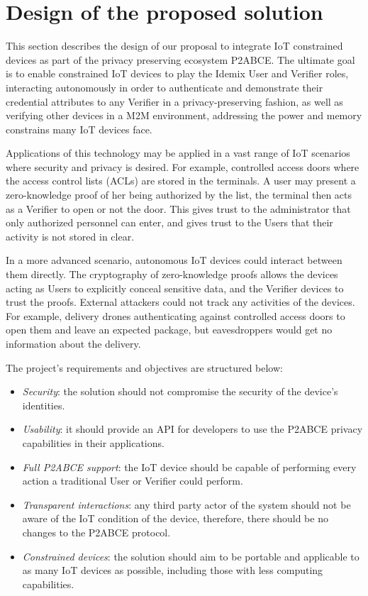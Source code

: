 
\section{Design of the proposed solution}\label{ch:design}

This section describes the design of our proposal to integrate IoT constrained devices as part of the privacy preserving ecosystem P2ABCE. The ultimate goal is to enable constrained IoT devices to play the Idemix User and Verifier roles, interacting autonomously in order to authenticate and demonstrate their credential attributes to any Verifier in a privacy-preserving fashion, as well as verifying other devices in a M2M environment, addressing the power and memory constrains many IoT devices face. 

Applications of this technology may be applied in a vast range of IoT scenarios where security and privacy is desired. For example, controlled access doors where the access control lists (ACLs) are stored in the terminals. A user may present a zero-knowledge proof of her being authorized by the list, the terminal then acts as a Verifier to open or not the door. This gives trust to the administrator that only authorized personnel can enter, and gives trust to the Users that their activity is not stored in clear. 

In a more advanced scenario, autonomous IoT devices could interact between them directly. The cryptography of zero-knowledge proofs allows the devices acting as Users to explicitly conceal sensitive data, and the Verifier devices to trust the proofs. External attackers could not track any activities of the devices. For example, delivery drones authenticating against controlled access doors to open them and leave an expected package, but eavesdroppers would get no information about the delivery.

The project's requirements and objectives are structured below:

\begin{itemize}
	\item \textit{Security}: the solution should not compromise the security of the device's identities.
	\item \textit{Usability}: it should provide an API for developers to use the P2ABCE privacy capabilities in their applications.
	\item \textit{Full P2ABCE support}: the IoT device should be capable of performing every action a traditional User or Verifier could perform.
	\item \textit{Transparent interactions}: any third party actor of the system should not be aware of the IoT condition of the device, therefore, there should be no changes to the P2ABCE protocol.
	\item \textit{Constrained devices}: the solution should aim to be portable and applicable to as many IoT devices as possible, including those with less computing capabilities.
\end{itemize}

